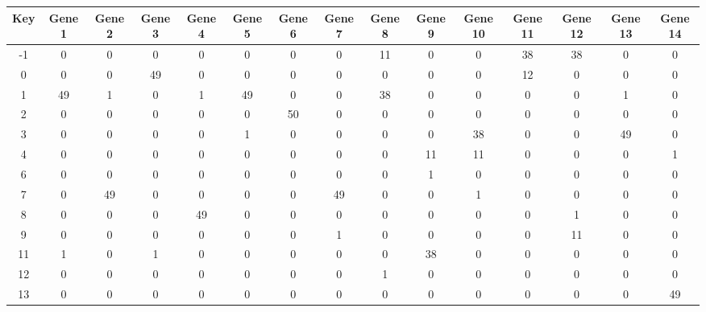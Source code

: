 \begin{tabular}{|c|c|c|c|c|c|c|c|c|c|c|c|c|c|c|}
\hline
Key & Gene 1 & Gene 2 & Gene 3 & Gene 4 & Gene 5 & Gene 6 & Gene 7 & Gene 8 & Gene 9 & Gene 10 & Gene 11 & Gene 12 & Gene 13 & Gene 14 \\
\hline
-1 & 0 & 0 & 0 & 0 & 0 & 0 & 0 & 11 & 0 & 0 & 38 & 38 & 0 & 0 \\
0 & 0 & 0 & 49 & 0 & 0 & 0 & 0 & 0 & 0 & 0 & 12 & 0 & 0 & 0 \\
1 & 49 & 1 & 0 & 1 & 49 & 0 & 0 & 38 & 0 & 0 & 0 & 0 & 1 & 0 \\
2 & 0 & 0 & 0 & 0 & 0 & 50 & 0 & 0 & 0 & 0 & 0 & 0 & 0 & 0 \\
3 & 0 & 0 & 0 & 0 & 1 & 0 & 0 & 0 & 0 & 38 & 0 & 0 & 49 & 0 \\
4 & 0 & 0 & 0 & 0 & 0 & 0 & 0 & 0 & 11 & 11 & 0 & 0 & 0 & 1 \\
6 & 0 & 0 & 0 & 0 & 0 & 0 & 0 & 0 & 1 & 0 & 0 & 0 & 0 & 0 \\
7 & 0 & 49 & 0 & 0 & 0 & 0 & 49 & 0 & 0 & 1 & 0 & 0 & 0 & 0 \\
8 & 0 & 0 & 0 & 49 & 0 & 0 & 0 & 0 & 0 & 0 & 0 & 1 & 0 & 0 \\
9 & 0 & 0 & 0 & 0 & 0 & 0 & 1 & 0 & 0 & 0 & 0 & 11 & 0 & 0 \\
11 & 1 & 0 & 1 & 0 & 0 & 0 & 0 & 0 & 38 & 0 & 0 & 0 & 0 & 0 \\
12 & 0 & 0 & 0 & 0 & 0 & 0 & 0 & 1 & 0 & 0 & 0 & 0 & 0 & 0 \\
13 & 0 & 0 & 0 & 0 & 0 & 0 & 0 & 0 & 0 & 0 & 0 & 0 & 0 & 49 \\
\hline
\end{tabular}